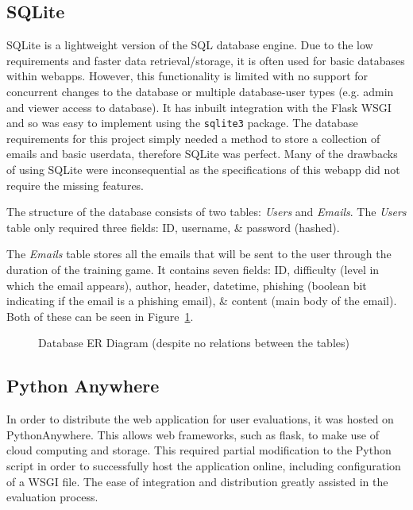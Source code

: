 \documentclass{l4proj}
\begin{document}
\subsection{SQLite}
SQLite is a lightweight version of the SQL database engine. Due to the low requirements and faster data retrieval/storage, it is often used for basic databases within webapps. However, this functionality is limited with no support for concurrent changes to the database or multiple database-user types (e.g. admin and viewer access to database). It has inbuilt integration with the Flask WSGI and so was easy to implement using the \verb|sqlite3| package. The database requirements for this project simply needed a method to store a collection of emails and basic userdata, therefore SQLite was perfect. Many of the drawbacks of using SQLite were inconsequential as the specifications of this webapp did not require the missing features.

The structure of the database consists of two tables: \textit{Users} and \textit{Emails}. The \textit{Users} table only required three fields: ID, username, & password (hashed).

The \textit{Emails} table stores all the emails that will be sent to the user through the duration of the training game. It contains seven fields: ID, difficulty (level in which the email appears), author, header, datetime, phishing (boolean bit indicating if the email is a phishing email), & content (main body of the email). Both of these can be seen in Figure~\ref{fig:database}. 

\begin{figure}[H]
    \centering
    \caption{Database ER Diagram (despite no relations between the tables)}
    \label{fig:database} 
\end{figure}


\subsection{Python Anywhere}
In order to distribute the web application for user evaluations, it was hosted on PythonAnywhere. This allows web frameworks, such as flask, to make use of cloud computing and storage. This required partial modification to the Python script in order to successfully host the application online, including configuration of a WSGI file. The ease of integration and distribution greatly assisted in the evaluation process.
\end{document}

